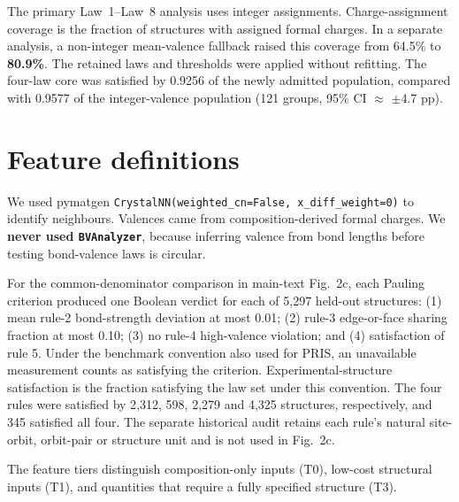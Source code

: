 The primary Law~1--Law~8 analysis uses integer assignments. Charge-assignment
coverage is the fraction of structures with assigned formal charges. In a
separate analysis, a non-integer mean-valence fallback raised this coverage from
64.5\% to \textbf{80.9\%}. The retained laws and thresholds were applied without
refitting. The four-law core was satisfied by 0.9256 of the newly admitted
population, compared with 0.9577 of the integer-valence population (121 groups,
95\% CI $\approx$ $\pm$4.7 pp).

\section{Feature definitions}\label{note:s3}

We used pymatgen \texttt{CrystalNN(\allowbreak weighted\_cn=False,\allowbreak\
x\_diff\_weight=0)} to identify neighbours. Valences came from
composition-derived formal charges. We \textbf{never used \texttt{BVAnalyzer}},
because inferring valence from bond lengths before testing bond-valence laws is
circular.

For the common-denominator comparison in main-text Fig.~2c, each Pauling
criterion produced one Boolean verdict for each of 5{,}297 held-out structures:
(1) mean rule-2 bond-strength deviation at most 0.01; (2) rule-3 edge-or-face
sharing fraction at most 0.10; (3) no rule-4 high-valence violation; and (4)
satisfaction of rule 5. Under the benchmark convention also used for PRIS, an
unavailable measurement counts as satisfying the criterion. Experimental-structure
satisfaction is the fraction satisfying the law set under this convention. The
four rules were satisfied by 2{,}312, 598, 2{,}279 and 4{,}325 structures,
respectively, and 345 satisfied all four. The separate historical audit retains
each rule's natural site-orbit, orbit-pair or structure unit and is not used in
Fig.~2c.

The feature tiers distinguish composition-only inputs (T0), low-cost structural
inputs (T1), and quantities that require a fully specified structure (T3).

